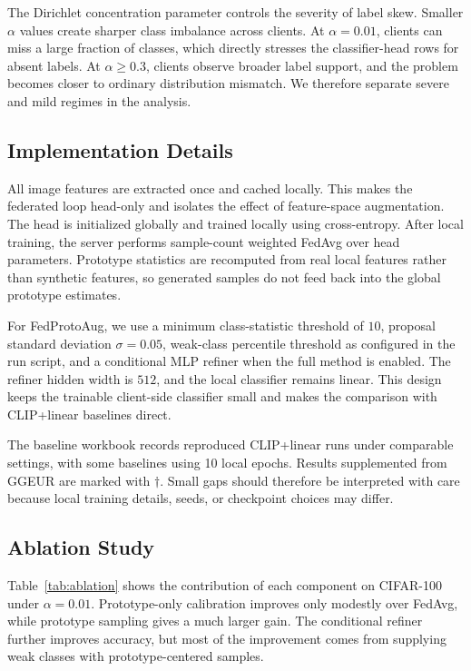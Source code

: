 ﻿\documentclass[runningheads]{llncs}
\newcommand{\method}{FedProtoAug}
\begin{document}
The Dirichlet concentration parameter controls the severity of label skew. Smaller $\alpha$ values create sharper class imbalance across clients. At $\alpha=0.01$, clients can miss a large fraction of classes, which directly stresses the classifier-head rows for absent labels. At $\alpha\ge0.3$, clients observe broader label support, and the problem becomes closer to ordinary distribution mismatch. We therefore separate severe and mild regimes in the analysis.

\subsection{Implementation Details}
All image features are extracted once and cached locally. This makes the federated loop head-only and isolates the effect of feature-space augmentation. The head is initialized globally and trained locally using cross-entropy. After local training, the server performs sample-count weighted FedAvg over head parameters. Prototype statistics are recomputed from real local features rather than synthetic features, so generated samples do not feed back into the global prototype estimates.

For \method, we use a minimum class-statistic threshold of $10$, proposal standard deviation $\sigma=0.05$, weak-class percentile threshold as configured in the run script, and a conditional MLP refiner when the full method is enabled. The refiner hidden width is $512$, and the local classifier remains linear. This design keeps the trainable client-side classifier small and makes the comparison with CLIP+linear baselines direct.

The baseline workbook records reproduced CLIP+linear runs under comparable settings, with some baselines using 10 local epochs. Results supplemented from GGEUR are marked with $\dagger$. Small gaps should therefore be interpreted with care because local training details, seeds, or checkpoint choices may differ.

\subsection{Ablation Study}
Table~\ref{tab:ablation} shows the contribution of each component on CIFAR-100 under $\alpha=0.01$. Prototype-only calibration improves only modestly over FedAvg, while prototype sampling gives a much larger gain. The conditional refiner further improves accuracy, but most of the improvement comes from supplying weak classes with prototype-centered samples.
\end{document}
